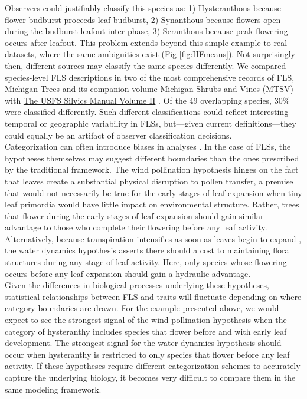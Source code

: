 \documentclass{article}
\begin{document}
\noindent Observers could justifiably classify this species as: 1) Hysteranthous because flower budburst proceeds leaf budburst, 2) Synanthous because flowers open during the budburst-leafout inter-phase, 3) Seranthous because peak flowering occurs after leafout. This problem extends beyond this simple example to real datasets, \citep[e.g.][]{OKeefe2015} where the same ambiguities exist (Fig \ref{fig:HFmeans}). Not surprisingly then, different sources may classify the same species differently. We compared species-level FLS descriptions in two of the most comprehensive records of FLS, \underline{Michigan Trees} and its companion volume \underline{Michigan Shrubs and Vines} (MTSV) \citep{Barnes2004,Barnes2016} with \underline{The USFS Silvics Manual Volume II} \citep{Burns1990}. Of the 49 overlapping species, 30\% were classified differently. Such different classifications could reflect interesting temporal or geographic variability in FLSs, but---given current definitions---they could equally be an artifact of observer classification decisions.\\

\noindent Categorization can often introduce biases in analyses \citep{Naggara2011,Royston2006}. In the case of FLSs, the hypotheses themselves may suggest different boundaries than the ones prescribed by the traditional framework. The wind pollination hypothesis hinges on the fact that leaves create a substantial physical disruption to pollen transfer, a premise that would not necessarily be true for the early stages of leaf expansion when tiny leaf primordia would have little impact on environmental structure. Rather, trees that flower during the early stages of leaf expansion should gain similar advantage to those who complete their flowering before any leaf activity. Alternatively, because transpiration intensifies as soon as leaves begin to expand \citep{Breda1996,Wang2018}, the water dynamics hypothesis asserts there should a cost to maintaining floral structures during any stage of leaf activity. Here, only species whose flowering occurs before any leaf expansion should gain a hydraulic advantage.\\ 

\noindent Given the differences in biological processes underlying these hypotheses, statistical relationships between FLS and traits will fluctuate depending on where category boundaries are drawn. For the example presented above, we would expect to see the strongest signal of the wind-pollination hypothesis when the category of hysteranthy includes species that flower before and with early leaf development. The strongest signal for the water dynamics hypothesis should occur when hysteranthy is restricted to only species that flower before any leaf activity. If these hypotheses require different categorization schemes to accurately capture the underlying biology, it becomes very difficult to compare them in the same modeling framework.\\
\end{document}
